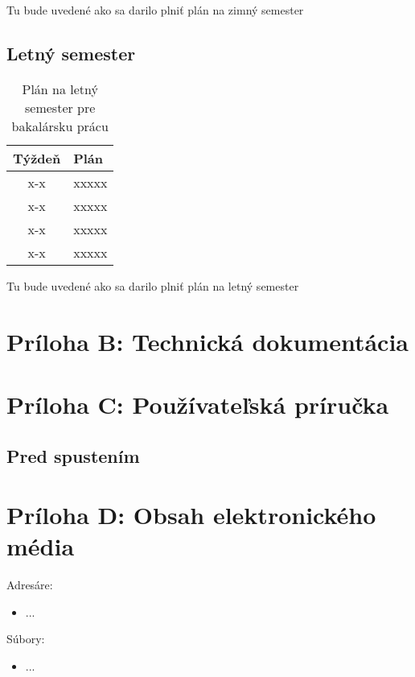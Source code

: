 \documentclass[12pt, twoside]{book}
\begin{document}
Tu bude uvedené ako sa darilo plniť plán na zimný semester

\subsection*{Letný semester}

\begin{table}[H]
\begin{center}
\renewcommand\thetable{A.2}
\caption{Plán na letný semester pre bakalársku prácu}
\begin{tabular}{ |c|C{10cm}| } 
 \hline
\textbf{Týždeň} & \textbf{Plán} 
 \\ \hline
x-x  & xxxxx
\\ \hline
x-x  & xxxxx
\\ \hline
x-x  & xxxxx
\\ \hline
x-x  & xxxxx
\\ \hline
\end{tabular}
\end{center}
\end{table}

Tu bude uvedené ako sa darilo plniť plán na letný semester

\newpage
\pagestyle{fancy}
\setcounter{page}{1}
\renewcommand{\thepage}{B-\arabic{page}} 
\thispagestyle{plain}
\makeatletter
{}  %
\makeatother
{}
{}

\section*{Príloha B: Technická dokumentácia}



\section*{Príloha C: Používateľská príručka}



\subsection{Pred spustením}



\section*{Príloha D: Obsah elektronického média}

\bigskip
\bigskip

Adresáre:
\begin{itemize}
\item
...
\end{itemize}

Súbory:
\begin{itemize}
\item 
...
\end{itemize}
 
\end{document}
